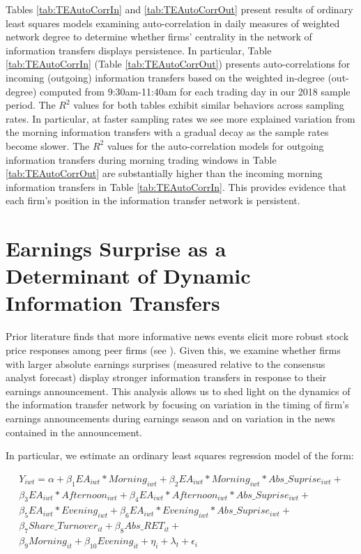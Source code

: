 Tables \ref{tab:TEAutoCorrIn} and \ref{tab:TEAutoCorrOut} present results of ordinary least squares models examining auto-correlation in daily measures of weighted network degree to determine whether firms’ centrality in the network of information transfers displays persistence.  In particular, Table \ref{tab:TEAutoCorrIn} (Table \ref{tab:TEAutoCorrOut}) presents auto-correlations for incoming (outgoing) information transfers based on the weighted in-degree (out-degree) computed from 9:30am-11:40am for each trading day in our 2018 sample period.  The $R^2$ values for both tables exhibit similar behaviors across sampling rates.  In particular, at faster sampling rates we see more explained variation from the morning information transfers with a gradual decay as the sample rates become slower.  The $R^2$ values for the auto-correlation models for outgoing information transfers during morning trading windows in Table \ref{tab:TEAutoCorrOut} are substantially higher than the incoming morning information transfers in Table \ref{tab:TEAutoCorrIn}.  This provides evidence that each firm's position in the information transfer network is persistent. 


\section{Earnings Surprise as a Determinant of Dynamic Information Transfers} %


Prior literature finds that more informative news events elicit more robust stock price responses among peer firms (see \cite{Foster1981,  Brochet2018}).  Given this,  we examine whether firms with larger absolute earnings surprises (measured relative to the consensus analyst forecast) display stronger information transfers in response to their earnings announcement.  This analysis allows us to shed light on the dynamics of the information transfer network by focusing on variation in the timing of firm’s earnings announcements during earnings season and on variation in the news contained in the announcement.  

In particular,  we estimate an ordinary least squares regression model of the form:

\setlength{\arraycolsep}{0.0em}
\begin{eqnarray}
Y_{iwt} = \alpha + \beta_1 EA_{iwt}  * Morning_{iwt} + \beta_2 EA_{iwt}  * Morning_{iwt} * Abs\_Suprise_{iwt} + \nonumber\\
\beta_3 EA_{iwt}  * Afternoon_{iwt} + \beta_4 EA_{iwt}  * Afternoon_{iwt} * Abs\_Suprise_{iwt} + \nonumber\\
\beta_5 EA_{iwt}  * Evening_{iwt} + \beta_6 EA_{iwt}  * Evening_{iwt} * Abs\_Suprise_{iwt} + \nonumber\\
\beta_7 Share\_Turnover_{it} + \beta_8 Abs\_RET_{it} + \nonumber\\
\beta_9 Morning_{it} + \beta_{10} Evening_{it} + \eta_{i} + \lambda_t +  \epsilon_{i}
\label{eq:EA-Surprise}
\end{eqnarray}
\setlength{\arraycolsep}{1pt}


